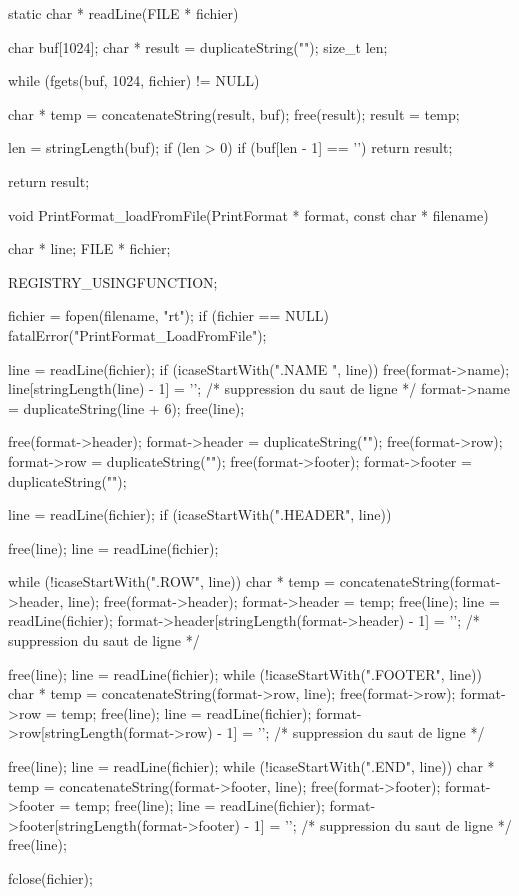 \begin{csourcecorrection}
static char * readLine(FILE * fichier) {
    char buf[1024];
    char * result = duplicateString("");
    size_t len;

    while (fgets(buf, 1024, fichier) != NULL) {
        char * temp = concatenateString(result, buf);
        free(result);
        result = temp;

        len = stringLength(buf);
        if (len > 0)
            if (buf[len - 1] == '\n') {
                return result;
            }
    }
    return result;
}

void PrintFormat_loadFromFile(PrintFormat * format, const char * filename) {
    char * line;
    FILE * fichier;

    REGISTRY_USINGFUNCTION;

    fichier = fopen(filename, "rt");
    if (fichier == NULL)
        fatalError("PrintFormat_LoadFromFile");

    line = readLine(fichier);
    if (icaseStartWith(".NAME ", line)) {
        free(format->name);
        line[stringLength(line) - 1] = '\0'; /* suppression du saut de ligne */
        format->name = duplicateString(line + 6);
    }
    free(line);

    free(format->header);
    format->header = duplicateString("");
    free(format->row);
    format->row = duplicateString("");
    free(format->footer);
    format->footer = duplicateString("");

    line = readLine(fichier);
    if (icaseStartWith(".HEADER", line)) {
        free(line);
        line = readLine(fichier);

        while (!icaseStartWith(".ROW", line)) {
            char * temp = concatenateString(format->header, line);
            free(format->header);
            format->header = temp;
            free(line);
            line = readLine(fichier);
        }
        format->header[stringLength(format->header) - 1] = '\0'; /* suppression du saut de ligne */
    }

    free(line);
    line = readLine(fichier);
    while (!icaseStartWith(".FOOTER", line)) {
        char * temp = concatenateString(format->row, line);
        free(format->row);
        format->row = temp;
        free(line);
        line = readLine(fichier);
    }
    format->row[stringLength(format->row) - 1] = '\0'; /* suppression du saut de ligne */

    free(line);
    line = readLine(fichier);
    while (!icaseStartWith(".END", line)) {
        char * temp = concatenateString(format->footer, line);
        free(format->footer);
        format->footer = temp;
        free(line);
        line = readLine(fichier);
    }
    format->footer[stringLength(format->footer) - 1] = '\0'; /* suppression du saut de ligne */
    free(line);

    fclose(fichier);
}
\end{csourcecorrection}


